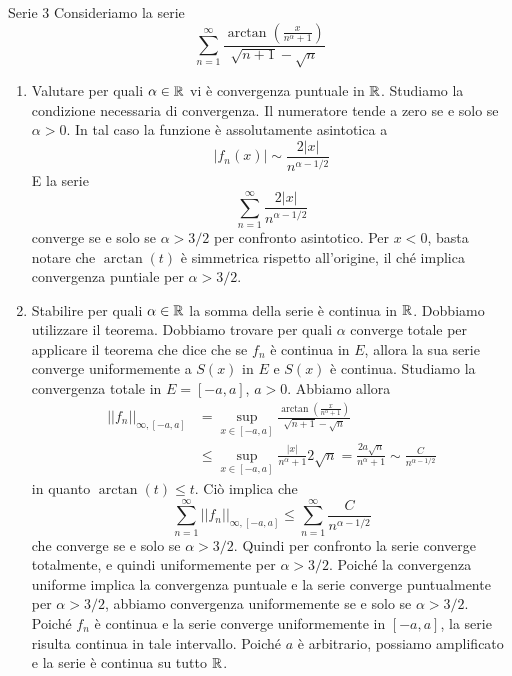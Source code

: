 \documentclass[a4paper]{article}
\begin{document}
\begin{snippetexercise}{Serie 3}
    Consideriamo la serie
    \[
        \sum_{n=1}^\infty \frac{\arctan\left(\frac{x}{n^\alpha + 1}\right)}{\sqrt{n+1} - \sqrt{n}}
    \]
    \begin{enumerate}
        \item Valutare per quali \(\alpha\in\mathbb{R}\) vi è convergenza puntuale in \(\mathbb{R}\).
        Studiamo la condizione necessaria di convergenza.
        Il numeratore tende a zero se e solo se \(\alpha > 0\).
        In tal caso la funzione è assolutamente asintotica a
        \[
            |f_n(x)| \sim \frac{2|x|}{n^{\alpha - 1/2}}
        \]
        E la serie
        \[
            \sum_{n=1}^\infty \frac{2|x|}{n^{\alpha - 1 /2}}
        \]
        converge se e solo se \(\alpha > 3/2\) per confronto asintotico.
        Per \(x<0\), basta notare che \(\arctan(t)\) è simmetrica rispetto all'origine,
        il ché implica convergenza puntiale per \(\alpha > 3/2\).
        \item Stabilire per quali \(\alpha\in\mathbb{R}\) la somma della serie è continua in \(\mathbb{R}\).
        Dobbiamo utilizzare il teorema. Dobbiamo trovare per quali \(\alpha\) converge totale
        per applicare il teorema che dice che se \(f_n\) è continua in \(E\), allora la sua serie converge
        uniformemente a \(S(x)\) in \(E\) e \(S(x)\) è continua.
        Studiamo la convergenza totale in \(E = [-a, a]\), \(a>0\).
        Abbiamo allora
        \begin{align*}
            ||f_n||_{\infty, [-a, a]} &= \sup_{x\in[-a,a]}
            \frac{\arctan\left(\frac{x}{n^\alpha + 1}\right)}{\sqrt{n+1} - \sqrt{n}} \\
            &\leq \sup_{x\in[-a,a]} \frac{|x|}{n^\alpha + 1}2\sqrt{n}
            = \frac{2a\sqrt{n}}{n^{\alpha} + 1} \sim \frac{C}{n^{\alpha - 1/2}}
        \end{align*}
        in quanto \(\arctan(t) \leq t\).
        Ciò implica che
        \[
            \sum_{n=1}^\infty ||f_n||_{\infty, [-a, a]} \leq
            \sum_{n=1}^\infty \frac{C}{n^{\alpha - 1/2}}
        \]
        che converge se e solo se \(\alpha > 3/2\).
        Quindi per confronto la serie converge totalmente, e quindi uniformemente per \(\alpha > 3/2\).
        Poiché la convergenza uniforme implica la convergenza puntuale e la serie converge puntualmente
        per \(\alpha > 3/2\), abbiamo convergenza uniformemente se e solo se \(\alpha > 3/2\).
        Poiché \(f_n\) è continua e la serie converge uniformemente in \([-a, a]\), la serie risulta continua in tale intervallo.
        Poiché \(a\) è arbitrario, possiamo amplificato e la serie è continua su tutto \(\mathbb{R}\).
    \end{enumerate}
\end{snippetexercise}
\end{document}
